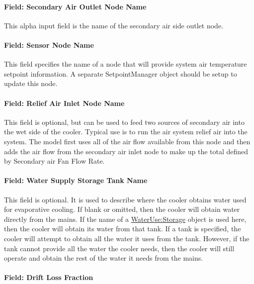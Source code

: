 \paragraph{Field: Secondary Air Outlet Node Name}\label{field-secondary-air-outlet-node-name}

This alpha input field is the name of the secondary air side outlet node.

\paragraph{Field: Sensor Node Name}\label{field-sensor-node-name-1}

This field specifies the name of a node that will provide system air temperature setpoint information. A separate SetpointManager object should be setup to update this node.

\paragraph{Field: Relief Air Inlet Node Name}\label{field-relief-air-inlet-node-name}

This field is optional, but can be used to feed two sources of secondary air into the wet side of the cooler. Typical use is to run the air system relief air into the system. The model first uses all of the air flow available from this node and then adds the air flow from the secondary air inlet node to make up the total defined by Secondary air Fan Flow Rate.

\paragraph{Field: Water Supply Storage Tank Name}\label{field-water-supply-storage-tank-name-4}

This field is optional. It is used to describe where the cooler obtains water used for evaporative cooling. If blank or omitted, then the cooler will obtain water directly from the mains. If the name of a \hyperref[waterusestorage]{WaterUse:Storage} object is used here, then the cooler will obtain its water from that tank. If a tank is specified, the cooler will attempt to obtain all the water it uses from the tank. However, if the tank cannot provide all the water the cooler needs, then the cooler will still operate and obtain the rest of the water it needs from the mains.

\paragraph{Field: Drift Loss Fraction}\label{field-drift-loss-fraction-2}

